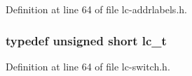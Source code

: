 Definition at line 64 of file lc-\/addrlabels.h.

\hypertarget{group__lc_ga3983e0c026396d5c4506779d770007ba}{
\subsubsection[{lc\_\-t}]{\setlength{\rightskip}{0pt plus 5cm}typedef unsigned short {\bf lc\_\-t}}}
\label{group__lc_ga3983e0c026396d5c4506779d770007ba}


Definition at line 64 of file lc-\/switch.h.

